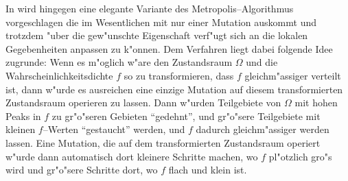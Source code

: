 	In \citep{Kelemen:2002p8514} wird hingegen eine elegante Variante des Metropolis--Algorithmus vorgeschlagen die im Wesentlichen mit nur einer Mutation auskommt und trotzdem "uber die gew"unschte Eigenschaft verf"ugt sich an die lokalen Gegebenheiten anpassen zu k"onnen. Dem Verfahren liegt dabei folgende Idee zugrunde: Wenn es m"oglich w"are den Zustandsraum $\Omega$ und die Wahrscheinlichkeitsdichte $f$ so zu transformieren, 	dass $f$ gleichm"assiger verteilt ist, dann w"urde es ausreichen eine einzige Mutation auf diesem transformierten Zustandsraum operieren zu lassen. Dann w"urden Teilgebiete von $\Omega$ mit hohen Peaks in $f$ zu gr"o"seren Gebieten ``gedehnt'', und gr"o"sere Teilgebiete mit kleinen $f$--Werten ``gestaucht'' werden, und $f$ dadurch gleichm"assiger werden lassen. Eine Mutation, die auf dem transformierten Zustandsraum operiert w"urde dann automatisch dort kleinere Schritte machen, wo $f$ pl"otzlich gro"s wird und gr"o"sere Schritte dort, wo $f$ flach und klein ist.
	
